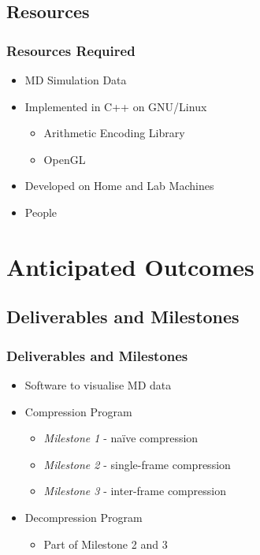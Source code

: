 \documentclass{beamer}
\begin{document}
\subsection{Resources}
\begin{frame}
  \frametitle{Resources Required}
  \begin{itemize}
  \item MD Simulation Data
  \item Implemented in C++ on GNU/Linux
    \begin{itemize}
    \item Arithmetic Encoding Library
    \item OpenGL
    \end{itemize}
  \item Developed on Home and Lab Machines
  \item People
  \end{itemize}
\end{frame}



\section{Anticipated Outcomes}


\subsection{Deliverables and Milestones}
\begin{frame}
  \frametitle{Deliverables and Milestones}
  \begin{itemize}
  \item Software to visualise MD data
  \item Compression Program
    \begin{itemize}
    \item \emph{Milestone 1} - na\"ive compression
    \item \emph{Milestone 2} - single-frame compression
    \item \emph{Milestone 3} - inter-frame compression
    \end{itemize}
  \item Decompression Program
    \begin{itemize}
    \item Part of Milestone 2 and 3
    \end{itemize}
  \end{itemize}
\end{frame}
\end{document}
